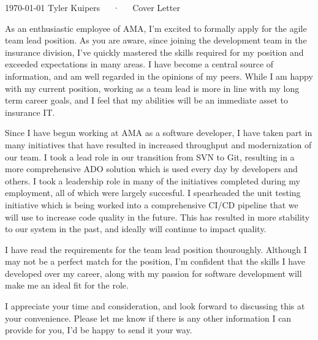 \documentclass[11pt, a4paper]{awesome-cv}
\begin{document}
\makecvheader[R]

\makecvfooter
  {\today}
  {Tyler Kuipers~~~·~~~Cover Letter}
  {\thepage}

\makelettertitle


\begin{cvletter}
As an enthusiastic employee of AMA, I'm excited to formally apply for the agile team lead position.  As you are aware, since joining the development team in the insurance 
division, I've quickly mastered the skills required for my position and exceeded expectations in many areas.  I have become a central source of information, and am well 
regarded in the opinions of my peers.  While I am happy with my current position, working as a team lead is more in line with my long term career goals, and I feel that
my abilities will be an immediate asset to insurance IT.

Since I have begun working at AMA as a software developer, I have taken part in many initiatives that have resulted in increased throughput and modernization of our team.
I took a lead role in our transition from SVN to Git, resulting in a more comprehensive ADO solution which is used every day by developers and others.  I took a leadership role
in many of the initiatives completed during my employment, all of which were largely succesful.  I spearheaded the unit testing initiative which is being worked into a comprehensive CI/CD pipeline that we 
will use to increase code quality in the future.  This has resulted in more stability to our system in the past, and ideally will continue to impact quality.

I have read the requirements for the team lead position thouroughly.  Although I may not be a perfect match for the position, I'm confident that the skills I have 
developed over my career, along with my passion for software development will make me an ideal fit for the role.

I appreciate your time and consideration, and look forward to discussing this at your convenience.  Please let me know if there is any other information
I can provide for you, I'd be happy to send it your way.

\end{cvletter}

\makeletterclosing



\end{document}
